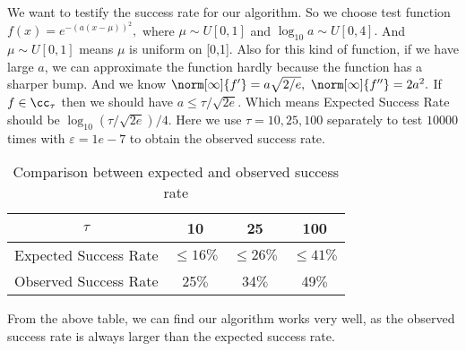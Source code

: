 We want to testify the success rate for our algorithm. So we
choose test function $f(x)=e^{-(a(x-\mu))^2},$
where $\mu \sim U[0,1]$ and $\log_{10} a \sim U[0,4].$
And $\mu \sim U[0,1]$ means $\mu$ is uniform on [0,1].
Also for this kind of function, if we have large $a$, we can approximate the function hardly
because the function has a sharper bump. And we know
$\norm[\infty]{f'}=a\sqrt{2/e}, \ \norm[\infty]{f''}=2a^2.$
If $f \in \cc_{\tau}$ then we should have
$a \leq \tau/\sqrt{2e}.$ Which means Expected Success Rate should be $\log_{10}(\tau/\sqrt{2e})/4.$
Here we use $\tau = 10, 25 , 100$ separately to test $10000$ times with
$\varepsilon = 1e-7$ to obtain the observed success rate.
\begin{table}[h]
\centering
\begin{tabular}{cccc}
$\tau$ &  10 & 25 & 100\\
\toprule
Expected Success Rate &  $\leq 16 \%$ &  $\leq 26 \%$  & $\leq 41 \%$ \\
Observed Success Rate & 25$\%$ &  34$\%$  & 49$\%$ \\
\end{tabular}
\caption{ Comparison between expected and observed success rate}
\end{table}

From the above table, we can find our algorithm works very well, as the observed
success rate is always larger than the expected success rate.\\




